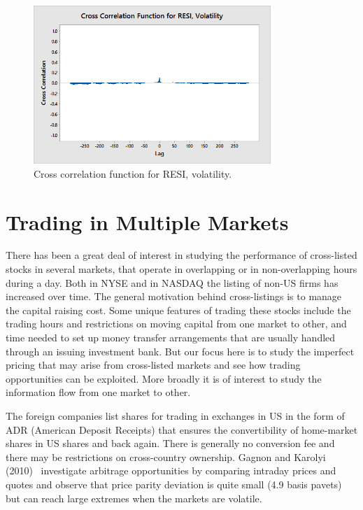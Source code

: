 \begin{figure}[!ht]
   \centering
    \includegraphics[width=0.8\textwidth]{chapters/chapter_stat_ts/figures/resivol.png}
   \caption{Cross correlation function for RESI, volatility. \label{fig:ccresi}}
\end{figure}










\section{Trading in Multiple Markets}

There has been a great deal of interest in studying the performance of cross-listed stocks in several markets, that operate in overlapping or in non-overlapping hours during a day. Both in NYSE and in NASDAQ the listing of non-US firms has increased over time. The general motivation behind cross-listings is to manage the capital raising cost. Some unique features of trading these stocks include the trading hours and restrictions on moving capital from one market to other, and time needed to set up money transfer arrangements that are usually handled through an issuing investment bank. But our focus here is to study the imperfect pricing that may arise from cross-listed markets and see how trading opportunities can be exploited. More broadly it is of interest to study the information flow from one market to other.


The foreign companies list shares for trading in exchanges in US in the form of ADR (American Deposit Receipts) that ensures the convertibility of home-market shares in US shares and back again. There is generally no conversion fee and there may be restrictions on cross-country ownership. Gagnon and Karolyi (2010)~\cite{gagkar} investigate arbitrage opportunities by comparing intraday prices and quotes and observe that price parity deviation is quite small (4.9 basis pavets) but can reach large extremes when the markets are volatile. 


